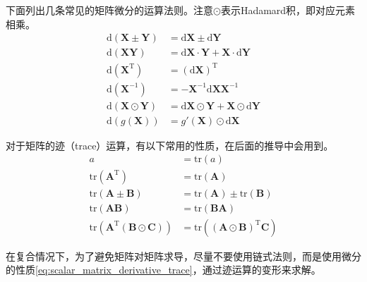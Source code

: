 \vspace{0.5\baselineskip}
下面列出几条常见的矩阵微分的运算法则。注意$\odot$表示Hadamard积，即对应元素相乘。
\begin{subequations}
	\begin{align}
		\mathrm{d}(\bm{X}\pm \bm{Y}) &= \mathrm{d}\bm{X} \pm \mathrm{d}\bm{Y} 
		\label{eq:matrix_derivative_add_sub} \\
		\mathrm{d}(\bm{XY}) &= \mathrm{d}\bm{X}\cdot \bm{Y} + \bm{X}\cdot \mathrm{d}\bm{Y}
		\label{eq:matrix_derivative_mul} \\
		\mathrm{d}(\bm{X}^{\mathrm{T}}) &= (\mathrm{d}\bm{X})^{\mathrm{T}}
		\label{eq:matrix_derivative_transpose} \\
		\mathrm{d}(\bm{X}^{-1}) &= -\bm{X}^{-1}\mathrm{d}\bm{X}\bm{X}^{-1}
		\label{eq:matrix_derivative_inverse} \\
		\mathrm{d}(\bm{X}\odot \bm{Y}) &= \mathrm{d}\bm{X}\odot \bm{Y} + \bm{X}\odot \mathrm{d}\bm{Y}
		\label{eq:matrix_derivative_hadamard} \\
		\mathrm{d}\left(g(\bm{X})\right) &= g'(\bm{X}) \odot \mathrm{d}\bm{X}
		\label{eq:matrix_derivative_hadamard2}
	\end{align}
\end{subequations}

对于矩阵的迹（trace）运算，有以下常用的性质，在后面的推导中会用到。
\begin{subequations}
	\begin{align}
		a &= \mathrm{tr}(a)
		\label{eq:matrix_trace_scalar} \\
		\mathrm{tr}(\bm{A}^{\mathrm{T}}) &= \mathrm{tr}(\bm{A})
		\label{eq:matrix_trace_transpose} \\
		\mathrm{tr}(\bm{A}\pm\bm{B}) &= \mathrm{tr}(\bm{A}) \pm \mathrm{tr}(\bm{B})
		\label{eq:matrix_trace_add_sub} \\
		\mathrm{tr}(\bm{AB}) &= \mathrm{tr}(\bm{BA})
		\label{eq:matrix_trace_mul} \\
		\mathrm{tr}\left(\bm{A}^{\mathrm{T}}(\bm{B} \odot \bm{C})\right) &= \mathrm{tr}\left((\bm{A} \odot \bm{B})^{\mathrm{T}}\bm{C}\right)
		\label{eq:matrix_trace_hadamard}
	\end{align}
\end{subequations}

在复合情况下，为了避免矩阵对矩阵求导，尽量不要使用链式法则，而是使用微分的性质\eqref{eq:scalar_matrix_derivative_trace}，通过迹运算的变形来求解。

